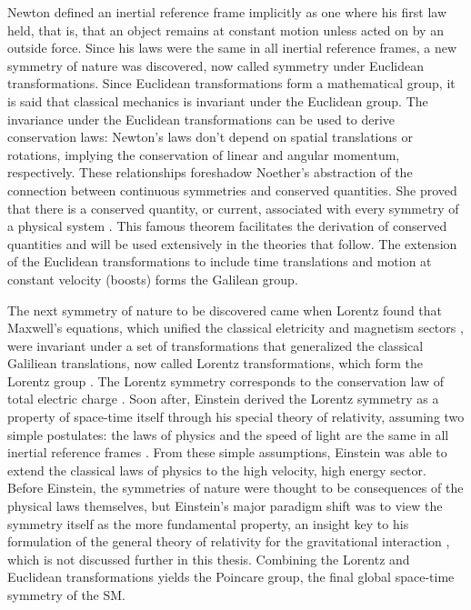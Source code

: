 \indent Newton defined an inertial reference frame implicitly as one where his first law held, that is, that an object remains at constant motion unless acted on by an outside force. Since his laws were the same in all inertial reference frames, a new symmetry of nature was discovered, now called symmetry under Euclidean transformations. Since Euclidean transformations form a mathematical group, it is said that classical mechanics is invariant under the Euclidean group. The invariance under the Euclidean transformations can be used to derive conservation laws: Newton's laws don't depend on spatial translations or rotations, implying the conservation of linear and angular momentum, respectively. These relationships foreshadow Noether's abstraction of the connection between continuous symmetries and conserved quantities. She proved that there is a conserved quantity, or current, associated with every symmetry of a physical system \cite{Noether:1918zz}. This famous theorem facilitates the derivation of conserved quantities and will be used extensively in the theories that follow. The extension of the Euclidean transformations to include time translations and motion at constant velocity (boosts) forms the Galilean group.

\indent The next symmetry of nature to be discovered came when Lorentz found that Maxwell's equations, which unified the classical eletricity and magnetism sectors \cite{Maxwell01011865}, were invariant under a set of transformations that generalized the classical Galiliean translations, now called Lorentz transformations, which form the Lorentz group \cite{Lorentz}. The Lorentz symmetry corresponds to the conservation law of total electric charge \cite{Noether:1918zz2}. Soon after, Einstein derived the Lorentz symmetry as a property of space-time itself through his special theory of relativity, assuming two simple postulates: the laws of physics and the speed of light are the same in all inertial reference frames \cite{Einstein:1905ve}. From these simple assumptions, Einstein was able to extend the classical laws of physics to the high velocity, high energy sector. Before Einstein, the symmetries of nature were thought to be consequences of the physical laws themselves, but Einstein's major paradigm shift was to view the symmetry itself as the more fundamental property, an insight key to his formulation of the general theory of relativity for the gravitational interaction \cite{Einstein:1914bt}, which is not discussed further in this thesis. Combining the Lorentz and Euclidean transformations yields the Poincare group, the final global space-time symmetry of the SM.

